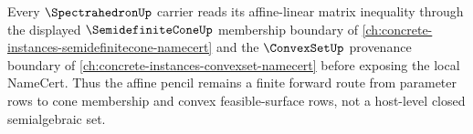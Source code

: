 Every $\SpectrahedronUp$ carrier reads its affine-linear matrix inequality through the displayed $\SemidefiniteConeUp$ membership boundary of \autoref{ch:concrete-instances-semidefinitecone-namecert} and the $\ConvexSetUp$ provenance boundary of \autoref{ch:concrete-instances-convexset-namecert} before exposing the local NameCert. Thus the affine pencil remains a finite forward route from parameter rows to cone membership and convex feasible-surface rows, not a host-level closed semialgebraic set.
